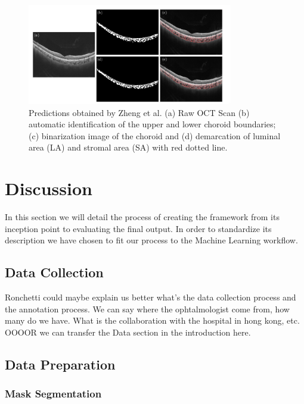 \documentclass[12pt,a4paper]{scrartcl}
\begin{document}
\begin{figure}[H]
    \centering
    \includegraphics[width=0.8\textwidth]{./images/choroidal-segmentation-zheng.png}
    \caption{Predictions obtained by Zheng et al. (a) Raw OCT Scan (b) automatic identification of the upper and lower choroid boundaries; (c) binarization image of the choroid and (d) demarcation of luminal area (LA) and stromal area (SA) with red dotted line. \cite{Zheng2020}}
\end{figure}





\section{Discussion}\label{s:Discussion}

In this section we will detail the process of creating the framework from its inception point to evaluating the final output. In order to standardize its description we have chosen to fit our process to the Machine Learning workflow. 
\subsection{Data Collection}

Ronchetti could maybe explain us better what's the data collection process and the annotation process. We can say where the ophtalmologist come from, how many do we have. What is the collaboration with the hospital in hong kong, etc. OOOOR we can transfer the Data section in the introduction here.

\subsection{Data Preparation}\label{ss:datapreparation}

\subsubsection{Mask Segmentation}
\end{document}
